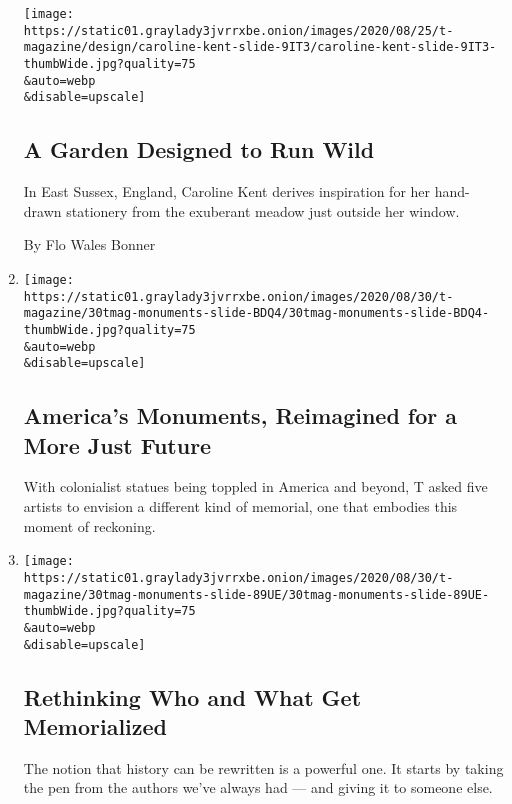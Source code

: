 \begin{enumerate}
  \texttt{[image: https://static01.graylady3jvrrxbe.onion/images/2020/08/25/t-magazine/design/caroline-kent-slide-9IT3/caroline-kent-slide-9IT3-thumbWide.jpg?quality=75\\\&auto=webp\\\&disable=upscale]}

  \hypertarget{a-garden-designed-to-run-wild}{%
  \subsection{A Garden Designed to Run
  Wild}\label{a-garden-designed-to-run-wild}}

  In East Sussex, England, Caroline Kent derives inspiration for her
  hand-drawn stationery from the exuberant meadow just outside her
  window.

  By Flo Wales Bonner
\item
  \href{/2020/08/24/t-magazine/confederate-monuments-reimagined-racism.html}{}

  \texttt{[image: https://static01.graylady3jvrrxbe.onion/images/2020/08/30/t-magazine/30tmag-monuments-slide-BDQ4/30tmag-monuments-slide-BDQ4-thumbWide.jpg?quality=75\\\&auto=webp\\\&disable=upscale]}

  \hypertarget{americas-monuments-reimagined-for-a-more-just-future}{%
  \subsection{America's Monuments, Reimagined for a More Just
  Future}\label{americas-monuments-reimagined-for-a-more-just-future}}

  With colonialist statues being toppled in America and beyond, T asked
  five artists to envision a different kind of memorial, one that
  embodies this moment of reckoning.
\item
  \href{/2020/08/24/t-magazine/monuments-womens-fashion-issue.html}{}

  \texttt{[image: https://static01.graylady3jvrrxbe.onion/images/2020/08/30/t-magazine/30tmag-monuments-slide-89UE/30tmag-monuments-slide-89UE-thumbWide.jpg?quality=75\\\&auto=webp\\\&disable=upscale]}

  \hypertarget{rethinking-who-and-what-get-memorialized}{%
  \subsection{Rethinking Who and What Get
  Memorialized}\label{rethinking-who-and-what-get-memorialized}}

  The notion that history can be rewritten is a powerful one. It starts
  by taking the pen from the authors we've always had --- and giving it
  to someone else.


\end{enumerate}
